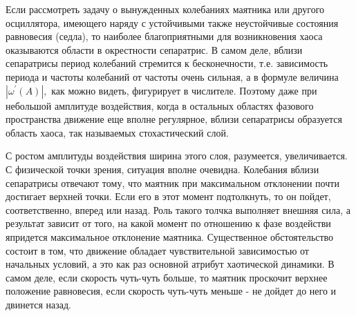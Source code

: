 \documentclass[11pt]{article}
\begin{document}
Если рассмотреть задачу о вынужденных колебаниях маятника или другого
осциллятора, имеющего наряду с устойчивыми также неустойчивые состояния
равновесия (седла), то наиболее благоприятными для возникновения хаоса
оказываются области в окрестности сепаратрис. В самом деле, вблизи
сепаратрисы период колебаний стремится к бесконечности, т.е. зависимость
периода и частоты колебаний от частоты очень сильная, а в формуле
величина \(\left|\omega^{\prime}(A)\right|,\) как можно видеть,
фигурирует в числителе. Поэтому даже при небольшой амплитуде
воздействия, когда в остальных областях фазового пространства движение
еще вполне регулярное, вблизи сепаратрисы образуется область хаоса, так
называемых стохастический слой.

С ростом амплитуды воздействия ширина этого слоя, разумеется,
увеличивается. С физической точки зрения, ситуация вполне очевидна.
Колебания вблизи сепаратрисы отвечают тому, что маятник при максимальном
отклонении почти достигает верхней точки. Если его в этот момент
подтолкнуть, то он пойдет, соответственно, вперед или назад. Роль такого
толчка выполняет внешняя сила, а результат зависит от того, на какой
момент по отношению к фазе воздействи япридется максимальное отклонение
маятника. Существенное обстоятельство состоит в том, что движение
обладает чувствительной зависимостью от начальных условий, а это как раз
основной атрибут хаотической динамики. В самом деле, если скорость
чуть-чуть больше, то маятник проскочит верхнее положение равновесия,
если скорость чуть-чуть меньше - не дойдет до него и двинется назад.
\end{document}
